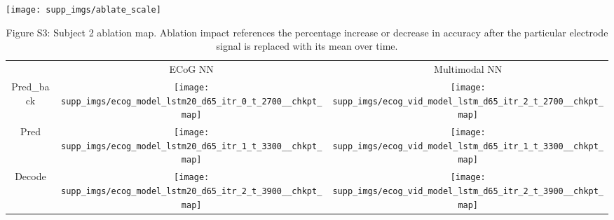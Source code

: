 \documentclass{article}
\begin{document}
\centering
\texttt{[image: supp\_imgs/ablate\_scale]}
\begin{table}[h!]
  \centering
  \begin{adjustbox}{max width=\textwidth}
  \begin{tabular}{  c  c  c  }
    
     & ECoG NN & Multimodal NN \\ 
    Pred\_back &
    \begin{minipage}{.55\textwidth}
      \texttt{[image: supp\_imgs/ecog\_model\_lstm20\_d65\_itr\_0\_t\_2700\_\_chkpt\_map]}
    \end{minipage}
    & 
    \begin{minipage}{.55\textwidth}
      \texttt{[image: supp\_imgs/ecog\_vid\_model\_lstm\_d65\_itr\_2\_t\_2700\_\_chkpt\_map]}
    \end{minipage} \\ 
    
        Pred & 
    \begin{minipage}{.55\textwidth}
      \texttt{[image: supp\_imgs/ecog\_model\_lstm20\_d65\_itr\_1\_t\_3300\_\_chkpt\_map]}
    \end{minipage}
    &
    \begin{minipage}{.55\textwidth}
      \texttt{[image: supp\_imgs/ecog\_vid\_model\_lstm\_d65\_itr\_1\_t\_3300\_\_chkpt\_map]}
    \end{minipage} \\ 
    
        Decode &
    \begin{minipage}{.55\textwidth}
      \texttt{[image: supp\_imgs/ecog\_model\_lstm20\_d65\_itr\_2\_t\_3900\_\_chkpt\_map]}
    \end{minipage}
    &
    \begin{minipage}{.55\textwidth}
      \texttt{[image: supp\_imgs/ecog\_vid\_model\_lstm\_d65\_itr\_2\_t\_3900\_\_chkpt\_map]}
    \end{minipage} \\ 
  \end{tabular}
  \end{adjustbox}
  \caption*{Figure S3: Subject 2 ablation map. Ablation impact references the percentage increase or decrease in accuracy after the particular electrode signal is replaced with its mean over time.}\label{tbl:s1_ablate}
\end{table}
\newpage
\end{document}
